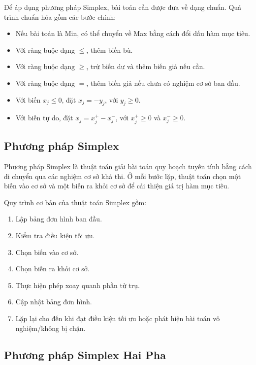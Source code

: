 \documentclass[14pt, a4paper]{extarticle}
\begin{document}
    Để áp dụng phương pháp Simplex, bài toán cần được đưa về dạng chuẩn. Quá trình chuẩn hóa gồm các bước chính:
    
    \begin{itemize}
        \item Nếu bài toán là Min, có thể chuyển về Max bằng cách đổi dấu hàm mục tiêu.
        \item Với ràng buộc dạng $\leq$, thêm biến bù.
        \item Với ràng buộc dạng $\geq$, trừ biến dư và thêm biến giả nếu cần.
        \item Với ràng buộc dạng $=$, thêm biến giả nếu chưa có nghiệm cơ sở ban đầu.
        \item Với biến $x_j \leq 0$, đặt $x_j = -y_j$, với $y_j \geq 0$.
        \item Với biến tự do, đặt $x_j = x_j^+ - x_j^-$, với $x_j^+ \geq 0$ và $x_j^- \geq 0$.
    \end{itemize}
    
    \subsection{Phương pháp Simplex}
    
    Phương pháp Simplex là thuật toán giải bài toán quy hoạch tuyến tính bằng cách di chuyển qua các nghiệm cơ sở khả thi. Ở mỗi bước lặp, thuật toán chọn một biến vào cơ sở và một biến ra khỏi cơ sở để cải thiện giá trị hàm mục tiêu.
    
    Quy trình cơ bản của thuật toán Simplex gồm:
    
    \begin{enumerate}
        \item Lập bảng đơn hình ban đầu.
        \item Kiểm tra điều kiện tối ưu.
        \item Chọn biến vào cơ sở.
        \item Chọn biến ra khỏi cơ sở.
        \item Thực hiện phép xoay quanh phần tử trụ.
        \item Cập nhật bảng đơn hình.
        \item Lặp lại cho đến khi đạt điều kiện tối ưu hoặc phát hiện bài toán vô nghiệm/không bị chặn.
    \end{enumerate}
    
    \subsection{Phương pháp Simplex Hai Pha}
    
\end{document}
